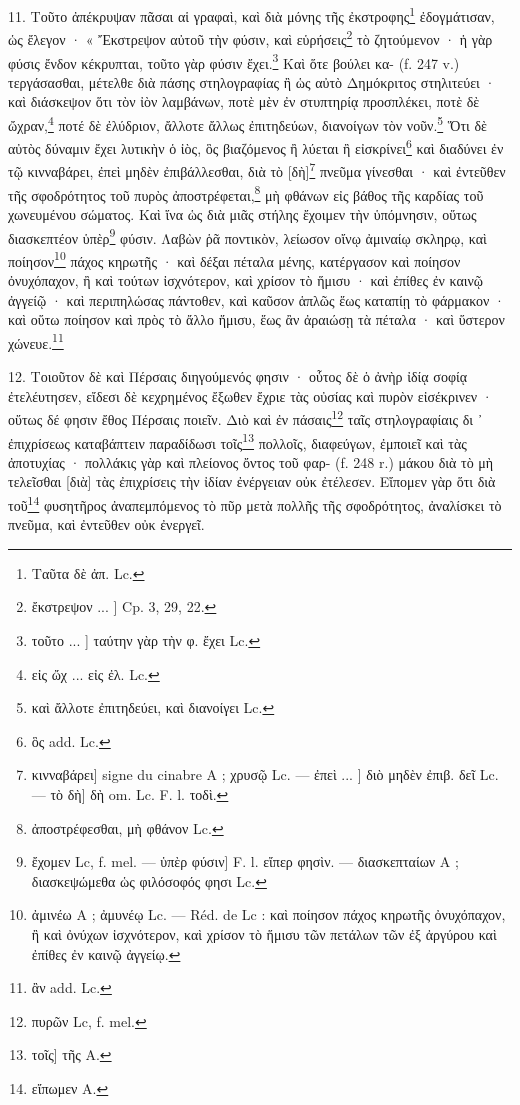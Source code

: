 \documentclass[a4paper, 11pt, oneside, polutonikogreek, french]{article}
\begin{document}
11. Τοῦτο ἀπέκρυψαν πᾶσαι αἱ γραφαὶ, καὶ διὰ μόνης τῆς ἐκστροφης\footnote{Ταῦτα δὲ ἀπ. Lc.} ἐδογμάτισαν, ὡς ἔλεγον · « Ἔκστρεψον αὐτοῦ τὴν φύσιν, καὶ εὑρήσεις\footnote{ἔκστρεψον ... ] Cp. 3, 29, 22.} τὸ ζητούμενον · ἡ γὰρ φύσις ἔνδον κέκρυπται, τοῦτο γὰρ φύσιν ἔχει.\footnote{τοῦτο ... ] ταύτην γὰρ τὴν φ. ἔχει Lc.} Καὶ ὅτε βούλει κα- (f. 247 v.) τεργάσασθαι, μέτελθε διὰ πάσης στηλογραφίας ἢ ὡς αὐτὸ Δημόκριτος στηλιτεύει · καὶ διάσκεψον ὅτι τὸν ἰὸν λαμβάνων, ποτὲ μὲν ἐν στυπτηρίᾳ προσπλέκει, ποτὲ δὲ ὤχραν,\footnote{εἰς ὤχ ... εἰς ἐλ. Lc.} ποτέ δὲ ἐλύδριον, ἄλλοτε ἄλλως ἐπιτηδεύων, διανοίγων τὸν νοῦν.\footnote{καὶ ἄλλοτε ἐπιτηδεύει, καὶ διανοίγει Lc.} Ὅτι δὲ αὐτὸς δύναμιν ἔχει λυτικὴν ὁ ἰὸς, ὃς βιαζόμενος ἢ λύεται ἢ εἰσκρίνει\footnote{ὃς add. Lc.} καὶ διαδύνει ἐν τῷ κινναβάρει, ἐπεὶ μηδὲν ἐπιβάλλεσθαι, διὰ τὸ [δὴ]\footnote{κινναβάρει] signe du cinabre A ; χρυσῷ Lc. --- ἐπεὶ ... ] διὸ μηδὲν ἐπιβ. δεῖ Lc. --- τὸ δὴ] δὴ om. Lc. F. l. τοδὶ.} πνεῦμα γίνεσθαι · καὶ ἐντεῦθεν τῆς σφοδρότητος τοῦ πυρὸς ἀποστρέφεται,\footnote{ἀποστρέφεσθαι, μὴ φθάνον Lc.} μὴ φθάνων εἰς βάθος τῆς καρδίας τοῦ χωνευμένου σώματος. Καὶ ἵνα ὡς διὰ μιᾶς στήλης ἔχοιμεν τὴν ὑπόμνησιν, οὕτως διασκεπτέον ὑπὲρ\footnote{ἔχομεν Lc, f. mel. --- ὑπὲρ φύσιν] F. l. εἴπερ φησὶν. --- διασκεπταίων A ; διασκεψώμεθα ὡς φιλόσοφός φησι Lc.} φύσιν. Λαβὼν ῥᾶ ποντικὸν, λείωσον οἴνῳ ἀμιναίῳ σκληρῳ, καὶ ποίησον\footnote{ἀμινέω A ; ἀμυνέῳ Lc. --- Réd. de Lc : καὶ ποίησον πάχος κηρωτῆς ὀνυχόπαχον, ἢ καὶ ὀνύχων ἰσχνότερον, καὶ χρίσον τὸ ἥμισυ τῶν πετάλων τῶν ἐξ ἀργύρου καὶ ἐπίθες ἐν καινῷ ἀγγείῳ.} πάχος κηρωτῆς · καὶ δέξαι πέταλα μένης, κατέργασον καὶ ποίησον ὀνυχόπαχον, ἢ καὶ τούτων ἰσχνότερον, καὶ χρίσον τὸ ἥμισυ · καὶ ἐπίθες ἐν καινῷ ἀγγείῷ · καὶ περιπηλώσας πάντοθεν, καὶ καῦσον ἁπλῶς ἕως καταπίῃ τὸ φάρμακον · καὶ οὕτω ποίησον καὶ πρὸς τὸ ἄλλο ἥμισυ, ἕως ἂν ἀραιώσῃ τὰ πέταλα · καὶ ὕστερον χώνευε.\footnote{ἂν add. Lc.}

12. Τοιοῦτον δὲ καὶ Πέρσαις διηγούμενός φησιν · οὗτος δὲ ὁ ἀνὴρ ἰδίᾳ σοφίᾳ ἐτελέυτησεν, εἴδεσι δὲ κεχρημένος ἔξωθεν ἔχριε τὰς οὐσίας καὶ πυρὸν εἰσέκρινεν · οὕτως δέ φησιν ἔθος Πέρσαις ποιεῖν. Διὸ καὶ ἐν πάσαις\footnote{πυρῶν Lc, f. mel.} ταῖς στηλογραφίαις δι ᾽ ἐπιχρίσεως καταβάπτειν παραδίδωσι τοῖς\footnote{τοῖς] τῆς A.} πολλοῖς, διαφεύγων, ἐμποιεῖ καὶ τὰς ἀποτυχίας · πολλάκις γὰρ καὶ πλείονος ὄντος τοῦ φαρ- (f. 248 r.) μάκου διὰ τὸ μὴ τελεῖσθαι [διὰ] τὰς ἐπιχρίσεις τὴν ἰδίαν ἐνέργειαν οὐκ ἐτέλεσεν. Εἴπομεν γὰρ ὅτι διὰ τοῦ\footnote{εἴπωμεν A.} φυσητῆρος ἀναπεμπόμενος τὸ πῦρ μετὰ πολλῆς τῆς σφοδρότητος, ἀναλίσκει τὸ πνεῦμα, καὶ ἐντεῦθεν οὐκ ἐνεργεῖ.
\end{document}
